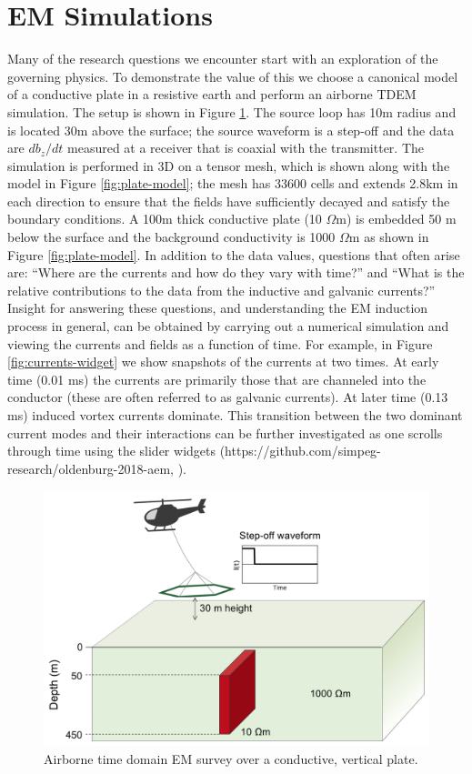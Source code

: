 \documentclass[paper]{geophysics}
\begin{document}
\section{EM Simulations}
Many of the research questions we encounter start with an exploration of the governing physics. To demonstrate the value of this we choose a canonical model of a conductive plate in a resistive earth and perform an airborne TDEM simulation. The setup is shown in Figure \ref{fig:plate-setup}. The source loop has 10m radius and is located 30m above the surface; the source waveform is a step-off and the data are $db_z/dt$ measured at a receiver that is coaxial with the transmitter. The simulation is performed in 3D on a tensor mesh, which is shown along with the model in Figure \ref{fig:plate-model}; the mesh has 33600 cells and extends 2.8km in each direction to ensure that the fields have sufficiently decayed and satisfy the boundary conditions. A 100m thick conductive plate (10 $\Omega$m) is embedded 50 m below the surface and the background conductivity is 1000 $\Omega$m as shown in Figure \ref{fig:plate-model}. In addition to the data values, questions that often arise are: ``Where are the currents and how do they vary with time?'' and ``What is the relative contributions to the data from the inductive and galvanic currents?'' Insight for answering these questions, and understanding the EM induction process in general, can be obtained by carrying out a numerical simulation and viewing the currents and fields as a function of time. For example, in Figure \ref{fig:currents-widget} we show snapshots of the currents at two times. At early time (0.01 ms) the currents are primarily those that are channeled into the conductor (these are often referred to as galvanic currents). At later time (0.13 ms) induced vortex currents dominate. This transition between the two dominant current modes and their interactions can be further investigated as one scrolls through time using the slider widgets (https://github.com/simpeg-research/oldenburg-2018-aem, \cite{kang2018}).


\begin{figure}
    \begin{center}
    \includegraphics[width=0.8\columnwidth]{figures/plate-setup.png}
    \end{center}
\caption{
    Airborne time domain EM survey over a conductive, vertical plate.
}
\label{fig:plate-setup}
\end{figure}
\end{document}
